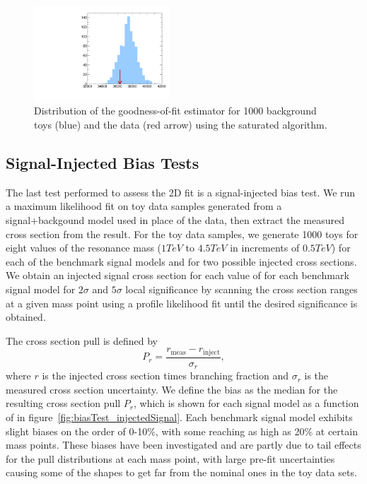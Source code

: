 \begin{figure}[htbp]
  \centering
  \includegraphics[width=0.45\textwidth]{fig/fitValidation/saturated_WprToWH1000.pdf}
  \caption{
    Distribution of the goodness-of-fit estimator for 1000 background toys (blue) and the data (red arrow) using the saturated algorithm.
  }
  \label{fig:GOF}
\end{figure}

\subsection{Signal-Injected Bias Tests}

The last test performed to assess the 2D fit is a signal-injected bias test.
We run a maximum likelihood fit on toy data samples generated from a signal+backgound model used in place of the data, then extract the measured cross section from the result.
For the toy data samples, we generate 1000 toys for eight values of the resonance mass \MX ($1\unit{TeV}$ to $4.5\unit{TeV}$ in increments of $0.5\unit{TeV}$) for each of the benchmark signal models and for two possible injected cross sections.
We obtain an injected signal cross section for each value of \MX for each benchmark signal model for $2\sigma$ and $5\sigma$ local significance by scanning the cross section ranges at a given mass point \MX using a profile likelihood fit until the desired significance is obtained.

The cross section pull is defined by
\begin{equation}
  P_r=\frac{r_\mathrm{meas}-r_\mathrm{inject}}{\sigma_r},
\end{equation}
where $r$ is the injected cross section times branching fraction and $\sigma_r$ is the measured cross section uncertainty.
We define the bias as the median for the resulting cross section pull $P_r$, which is shown for each signal model as a function of \MX in figure~\ref{fig:biasTest_injectedSignal}.
Each benchmark signal model exhibits slight biases on the order of 0-10\%, with some reaching as high as 20\% at certain mass points.
These biases have been investigated and are partly due to tail effects for the pull distributions at each mass point, with large pre-fit uncertainties causing some of the shapes to get far from the nominal ones in the toy data sets.

